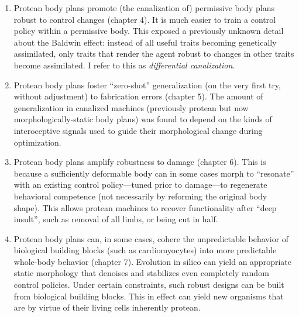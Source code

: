 \begin{enumerate}
    \item Protean body plans promote (the canalization of) permissive body plans robust to control changes (chapter 4).
    It is much easier to train a control policy within a permissive body. 
    This exposed a previously unknown detail about the Baldwin effect: instead of all useful traits becoming genetically assimilated, only traits that render the agent robust to changes in other traits become assimilated. 
    I refer to this as \textit{differential canalization}.
    
    \item Protean body plans foster ``zero-shot'' generalization (on the very first try, without adjustment) to fabrication errors (chapter 5).
    The amount of generalization in canalized machines (previously protean but now morphologically-static body plans) was found to depend on the kinds of interoceptive signals used to guide their morphological change during optimization.
    
    \item Protean body plans amplify robustness to damage (chapter 6).
    This is because a sufficiently deformable body can in some cases morph to ``resonate'' with an existing control policy---tuned prior to damage---to regenerate behavioral competence (not necessarily by reforming the original body shape).
    This allows protean machines to recover functionality after ``deep insult'', such as removal of all limbs, or being cut in half.
    
    \item Protean body plans 
    can, in some cases, cohere the unpredictable behavior of biological building blocks (such as cardiomyocytes) into more predictable whole-body behavior (chapter 7).
    Evolution in silico can yield an appropriate static morphology that denoises and stabilizes even completely random control policies.
    Under certain constraints, such robust designs can be built from biological building blocks.
    This in effect can yield new organisms that are by virtue of their living cells inherently protean.
    
    
\end{enumerate}

